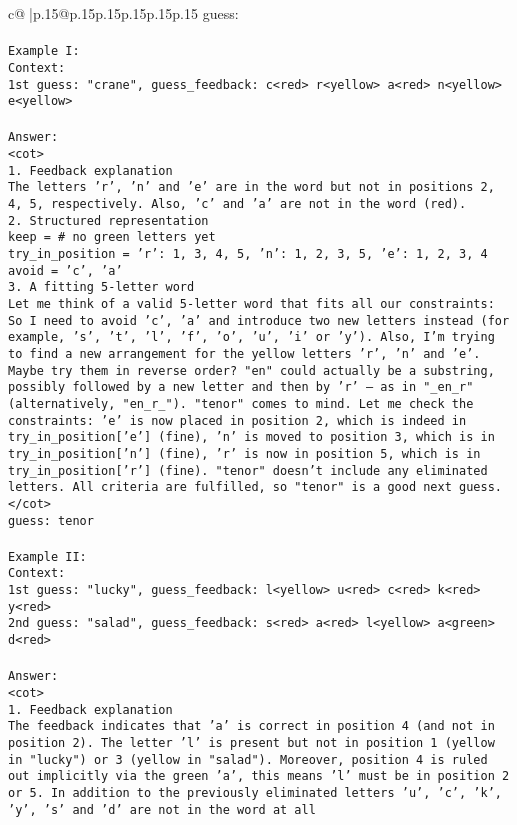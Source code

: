 \documentclass{article}
\begin{document}
{\begin{supertabular}{c@{$\;$}|p{.15\linewidth}@{}p{.15\linewidth}p{.15\linewidth}p{.15\linewidth}p{.15\linewidth}p{.15\linewidth}}
{{{guess:\\ \tt \\ \tt Example I:\\ \tt Context:\\ \tt 1st guess: "crane", guess_feedback: c<red> r<yellow> a<red> n<yellow> e<yellow>\\ \tt \\ \tt Answer:\\ \tt <cot>\\ \tt 1. Feedback explanation\\ \tt The letters 'r', 'n' and 'e' are in the word but not in positions 2, 4, 5, respectively. Also, 'c' and 'a' are not in the word (red).\\ \tt 2. Structured representation\\ \tt keep = {}  # no green letters yet\\ \tt try_in_position = {'r': {1, 3, 4, 5}, 'n': {1, 2, 3, 5}, 'e': {1, 2, 3, 4}}\\ \tt avoid = {'c', 'a'}\\ \tt 3. A fitting 5-letter word\\ \tt Let me think of a valid 5-letter word that fits all our constraints: So I need to avoid {'c', 'a'} and introduce two new letters instead (for example, 's', 't', 'l', 'f', 'o', 'u', 'i' or 'y'). Also, I'm trying to find a new arrangement for the yellow letters 'r', 'n' and 'e'. Maybe try them in reverse order? "en" could actually be a substring, possibly followed by a new letter and then by 'r' — as in "_en_r" (alternatively, "en_r_"). "tenor" comes to mind. Let me check the constraints: 'e' is now placed in position 2, which is indeed in try_in_position['e'] (fine), 'n' is moved to position 3, which is in try_in_position['n'] (fine), 'r' is now in position 5, which is in try_in_position['r'] (fine). "tenor" doesn't include any eliminated letters. All criteria are fulfilled, so "tenor" is a good next guess.\\ \tt </cot>\\ \tt guess: tenor\\ \tt \\ \tt Example II:\\ \tt Context:\\ \tt 1st guess: "lucky", guess_feedback: l<yellow> u<red> c<red> k<red> y<red>\\ \tt 2nd guess: "salad", guess_feedback: s<red> a<red> l<yellow> a<green> d<red>\\ \tt \\ \tt Answer:\\ \tt <cot>\\ \tt 1. Feedback explanation\\ \tt The feedback indicates that 'a' is correct in position 4 (and not in position 2). The letter 'l' is present but not in position 1 (yellow in "lucky") or 3 (yellow in "salad"). Moreover, position 4 is ruled out implicitly via the green 'a', this means 'l' must be in position 2 or 5. In addition to the previously eliminated letters {'u', 'c', 'k', 'y'}, 's' and 'd' are not in the word at all }}}
\end{supertabular}}
\end{document}

